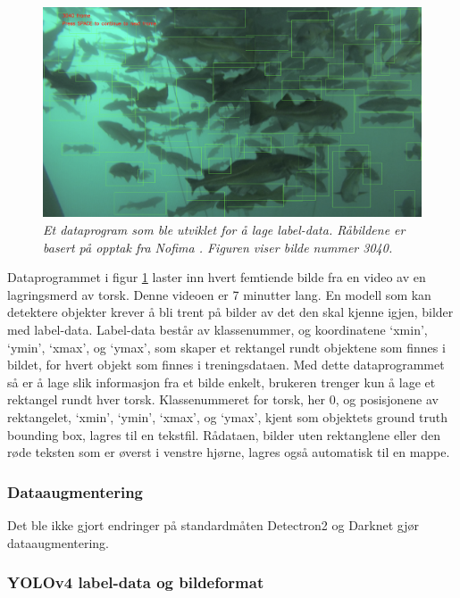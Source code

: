 \begin{figure}[h!]
\begin{center} 
\includegraphics[scale=0.35]{figures/dataset_tool_2}
\caption{\small \sl Et dataprogram som ble utviklet for å lage label-data. Råbildene er basert på opptak fra Nofima \cite{Nofima 2020}. Figuren viser bilde nummer 3040. \label{fig:dataset_tool}} 
\end{center} 
\end{figure} 

Dataprogrammet i figur \ref{fig:dataset_tool} laster inn hvert femtiende bilde fra en video av en lagringsmerd av torsk. Denne videoen er 7 minutter lang. En modell som kan detektere objekter krever å bli trent på bilder av det den skal kjenne igjen, bilder med label-data. Label-data består av klassenummer, og koordinatene `xmin', `ymin', `xmax', og `ymax', som skaper et rektangel rundt objektene som finnes i bildet, for hvert objekt som finnes i treningsdataen. Med dette dataprogrammet så er å lage slik informasjon fra et bilde enkelt, brukeren trenger kun å lage et rektangel rundt hver torsk. Klassenummeret for torsk, her 0, og posisjonene av rektangelet, `xmin', `ymin', `xmax', og `ymax', kjent som objektets ground truth bounding box, lagres til en tekstfil. Rådataen, bilder uten rektanglene eller den røde teksten som er øverst i venstre hjørne, lagres også automatisk til en mappe.

\subsubsection{Dataaugmentering}

Det ble ikke gjort endringer på standardmåten Detectron2 og Darknet gjør dataaugmentering.

\subsubsection{YOLOv4 label-data og bildeformat}


